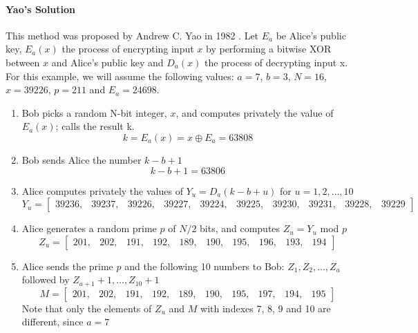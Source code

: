 \begin{refsection}
\paragraph{Yao's Solution}
This method was proposed by Andrew C. Yao in 1982 \cite{yao1982}. Let $E_a$ be Alice's public key, $E_a(x)$ the process of encrypting input $x$ by performing
a bitwise XOR between $x$ and Alice's public key and $D_a(x)$ the process of decrypting input x.
For this example, we will assume the following values: $a = 7$, $b = 3$, $N = 16$, $x = 39226$, $p = 211$ and $E_a = 24698$.

\begin{enumerate}
\item Bob picks a random N-bit integer, $x$, and computes privately the value of $E_a(x)$; calls the result k.
\begin{equation}\label{eq:encryptingX}
k = E_a(x) = x \oplus E_a = 63808
\end{equation}

\item Bob sends Alice the number $k - b + 1$
\begin{equation}\label{eq:encryptingX}
k - b + 1 = 63806
\end{equation}
\item Alice computes privately the values of $Y_u = D_a(k - b + u)$ for $u = 1,2,\ldots,10$\\
\[
Y_u = \begin{bmatrix}
        39236,&39237,&39226,&39227,&39224,&39225,&39230,&39231,&39228,&39229
      \end{bmatrix}
\]

\item Alice generates a random prime $p$ of $N/2$ bits, and computes $Z_u = Y_u$  mod  $p$
\[
Z_u = \begin{bmatrix}
        201,&202,&191,&192,&189,&190,&195,&196,&193,&194
      \end{bmatrix}
\]

\item Alice sends the prime $p$ and the following 10 numbers to Bob: $Z_1,Z_2,\ldots,Z_a$
followed by $Z_{a+1}+1,\ldots,Z_{10}+1$
\[
M = \begin{bmatrix}
        201,&202,&191,&192,&189,&190,&195,&197,&194,&195
      \end{bmatrix}
\]
Note that only the elements of $Z_u$ and $M$ with indexes 7, 8, 9 and 10 are different, since $a = 7$


\end{enumerate}
\end{refsection}

